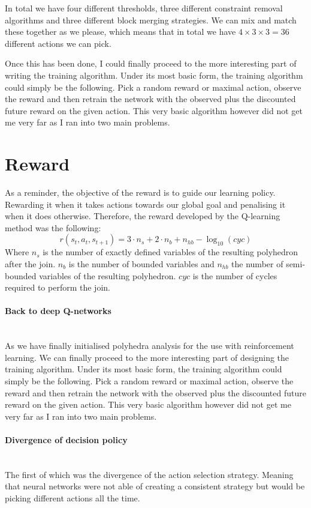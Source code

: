 In total we have four different thresholds, three different constraint removal algorithms and three different block merging strategies. We can mix and match these together as we please, which means that in total we have $4\times 3\times 3 =36$ different actions we can pick.



Once this has been done, I could finally proceed to the more interesting part of writing the training algorithm. Under its most basic form, the training algorithm could simply be the following. Pick a random reward or maximal action, observe the reward and then retrain the network with the observed plus the discounted  future reward on the given action. This very basic algorithm however did not get me very far as I ran into two main problems.
\section{Reward}
As a reminder, the objective of the reward is to guide our learning policy. Rewarding it when it takes actions towards our global goal and penalising it when it does otherwise. Therefore, the reward developed by the Q-learning method was the following:
\begin{equation}
	r(s_t,a_t,s_{t+1}) = 3  \cdot n_s + 2 \cdot n_b + n_{hb} - \log_{10}(cyc)
\end{equation}
Where $n_s$ is the number of exactly defined variables of the resulting polyhedron after the join. $n_b$ is the number of bounded variables and $n_{hb}$ the number of semi-bounded variables of the resulting polyhedron. $cyc$ is the number of cycles required to perform the join.
\paragraph{Back to deep Q-networks}\mbox{}\\
As we have finally initialised polyhedra analysis for the use with reinforcement learning. We can finally proceed to the more interesting part of designing the training algorithm. Under its most basic form, the training algorithm could simply be the following. Pick a random reward or maximal action, observe the reward and then retrain the network with the observed plus the discounted  future reward on the given action. This very basic algorithm however did not get me very far as I ran into two main problems.

\paragraph{Divergence of decision policy}\mbox{}\\
The first of which was the divergence of the action selection strategy. Meaning that neural networks were not able of creating a consistent strategy but would be picking different actions all the time.
